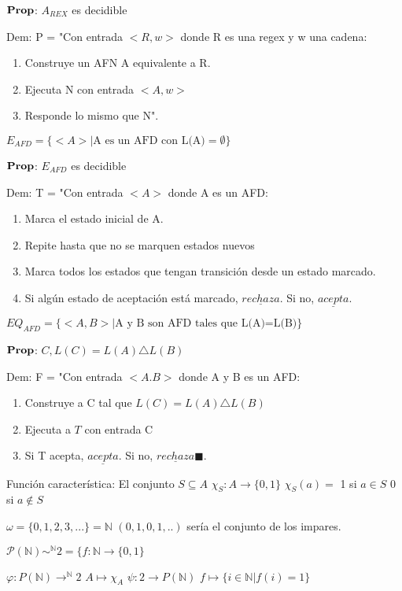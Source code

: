 \documentclass{homework}
\begin{document}
$\bf{Prop}$: $A_{REX}$ es decidible

Dem: P = "Con entrada $<R, w >$ donde R es una regex y w una cadena:
\begin{enumerate}
	\item Construye un AFN A equivalente a R.
	\item Ejecuta N con entrada $<A,w>$
	\item Responde lo mismo que N".
\end{enumerate}


$E_{AFD}  = \{<A> | \text{A es un AFD con L(A)}=\emptyset\}$ 

$\bf{Prop}$: $E_{AFD}$ es decidible

Dem: T = "Con entrada $<A>$ donde A es un AFD:
\begin{enumerate}
	\item Marca el estado inicial de A.
	\item Repite hasta que no se marquen estados nuevos
	\item Marca todos los estados que tengan transición desde un estado marcado.
	\item  Si algún estado de aceptación está marcado, $\underline{rechaza}$. Si no, $\underline{acepta}$.
\end{enumerate}

$EQ_{AFD}  = \{<A,B> | \text{A y B son AFD tales que L(A)=L(B)}\}$ 

$\bf{Prop}$: $C, L(C) = L(A)\triangle L(B)$

Dem: F = "Con entrada $<A.B>$ donde A y B es un AFD:
\begin{enumerate}
	\item Construye a C tal que $L(C)=L(A)\triangle L(B)$
	\item Ejecuta a $T$ con entrada C
	\item  Si T acepta, $\underline{acepta}$. Si no, $\underline{rechaza} \blacksquare$.
\end{enumerate}


Función característica:
El conjunto $S \subseteq A$ $\chi_{S} : A \rightarrow \{0, 1\}$
$\chi_{S}(a) =$ 1 si $a \in S$ 0 si $a \notin S$

$\omega = \{0,1,2,3,...\} = \mathds{N}$
$(0,1,0,1,..)$ sería el conjunto de los impares.

$\mathcal{P}(\mathds{N}) \sim^{\mathds{N}} 2 = \{f: \mathds{N} \rightarrow \{0,1\}$

$\varphi : P(\mathds{N}) \rightarrow^{\mathds{N}} 2$
$A \mapsto \chi_{A}$
$\psi : 2 \rightarrow P(\mathds{N})$
$f \mapsto \{i \in \mathds{N} | f(i) = 1\}$
\end{document}
